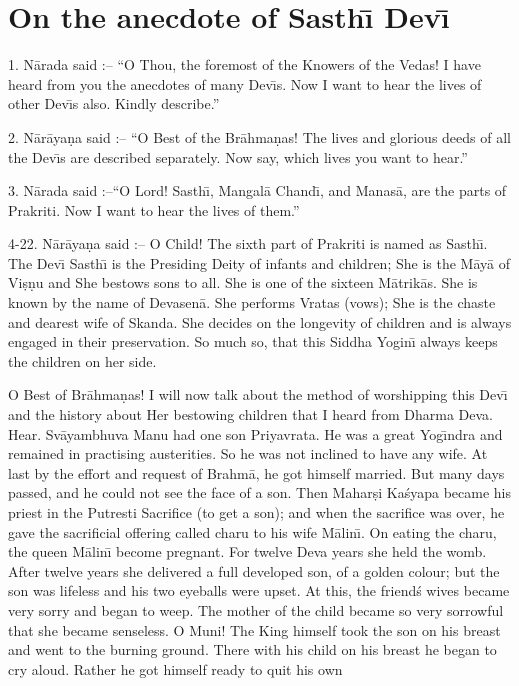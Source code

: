\chapter{On the anecdote of Sasth\={\i} Dev\={\i}}

1. N\=arada said :-- ``O Thou, the foremost of the Knowers of the Vedas! I have heard from you the anecdotes of many Dev\={\i}s. Now I want to hear the lives of other Dev\={\i}s also. Kindly describe.''

2. N\=ar\=aya\d{n}a said :-- ``O Best of the Br\=ahma\d{n}as! The lives and glorious deeds of all the Dev\={\i}s are described separately. Now say, which lives you want to hear.''

3. N\=arada said :--``O Lord! Sasth\={\i}, Mangal\=a Chand\={\i}, and Manas\=a, are the parts of Prakriti. Now I want to hear the lives of them.''

4-22. N\=ar\=aya\d{n}a said :-- O Child! The sixth part of Prakriti is named as Sasth\={\i}. The Dev\={\i} Sasth\={\i} is the Presiding Deity of infants and children; She is the M\=ay\=a of Vi\d{s}\d{n}u and She bestows sons to all. She is one of the sixteen M\=atrik\=as. She is known by the name of Devasen\=a. She performs Vratas (vows); She is the chaste and dearest wife of Skanda. She decides on the longevity of children and is always engaged in their preservation. So much so, that this Siddha Yogin\={\i} always keeps the children on her side.

O Best of Br\=ahma\d{n}as! I will now talk about the method of worshipping this Dev\={\i} and the history about Her bestowing children that I heard from Dharma Deva. Hear. Sv\=ayambhuva Manu had one son Priyavrata. He was a great Yog\={\i}ndra and remained in practising austerities. So he was not inclined to have any wife. At last by the effort and request of Brahm\=a, he got himself married. But many days passed, and he could not see the face of a son. Then Mahar\d{s}i Ka\'syapa became his priest in the Putresti Sacrifice (to get a son); and when the sacrifice was over, he gave the sacrificial offering called charu to his wife M\=alin\={\i}. On eating the charu, the queen M\=alin\={\i} become pregnant. For twelve Deva years she held the womb. After twelve years she delivered a full developed son, of a golden colour; but the son was lifeless and his two eyeballs were upset. At this, the friend\'s wives became very sorry and began to weep. The mother of the child became so very sorrowful that she became senseless. O Muni! The King himself took the son on his breast and went to the burning ground. There with his child on his breast he began to cry aloud. Rather he got himself ready to quit his own

